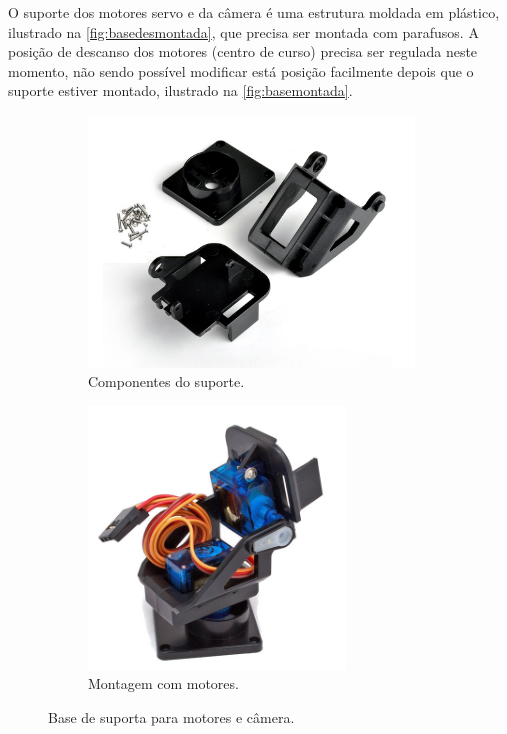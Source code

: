 O suporte dos motores servo e da câmera é uma estrutura moldada em plástico, ilustrado na \autoref{fig:basedesmontada}, que precisa ser montada com parafusos. A posição de descanso dos motores (centro de curso) precisa ser regulada neste momento, não sendo possível modificar está posição facilmente depois que o suporte estiver montado, ilustrado na \autoref{fig:basemontada}.\par

\begin{figure}[H]
	\centering
	\begin{subfigure}{.5\textwidth}
		\includegraphics[width=0.95\textwidth]{figuras/base2.jpg}
		\caption{Componentes do suporte.}
		\label{fig:basedesmontada}
	\end{subfigure}%
	\begin{subfigure}{.5\textwidth}
		\includegraphics[width=0.75\textwidth]{figuras/base3.jpg}
		\caption{Montagem com motores.}
		\label{fig:basemontada}
	\end{subfigure}
	\caption{Base de suporta para motores e câmera.}
\end{figure}

